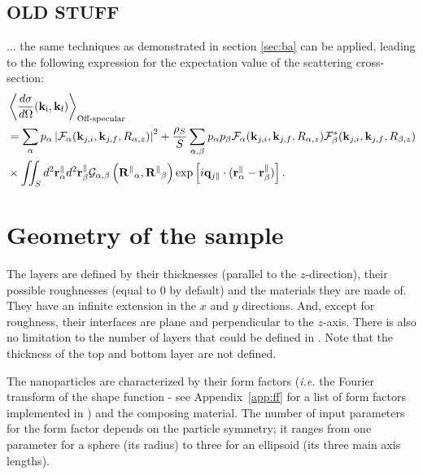 \subsection{OLD STUFF}

... the same techniques as demonstrated in section \ref{sec:ba} can be applied, leading to the following expression for the expectation value of the scattering cross-section:
\begin{align*}
  & \left\langle \frac{d\sigma}{d\Omega}(\mathbf{k}_{\text{i}},\mathbf{k}_{\text{f}}) \right\rangle_{\text{Off-specular}}  \\
  & = \sum_\alpha p_\alpha \left\lvert \mathcal{F}_\alpha(\mathbf{k}_{j,i},\mathbf{k}_{j,f}, R_{\alpha,z})\right\rvert ^2 + \frac{\rho_S}{S}\sum_{\alpha,\beta} p_\alpha p_\beta \mathcal{F}_\alpha (\mathbf{k}_{j,i},\mathbf{k}_{j,f}, R_{\alpha,z})\mathcal{F}_\beta^*(\mathbf{k}_{j,i},\mathbf{k}_{j,f}, R_{\beta,z}) \\
  & \times \iint_S d^2\mathbf{r}_\alpha^\parallel d^2\mathbf{r}_\beta^\parallel \mathcal{G}_{\alpha ,\beta}\left( \mathbf{R^\parallel}_{\alpha} , \mathbf{R^\parallel}_{\beta} \right) \exp \left[ i\mathbf{q}_{j\parallel}\cdot (\mathbf{r}_\alpha^\parallel - \mathbf{r}_\beta^\parallel ) \right].
\end{align*}

\section{Geometry of the sample}

The layers are defined by their thicknesses (parallel to the
$z$-direction), their possible
roughnesses (equal to 0 by default) and the
materials they are made of. They have an infinite extension in the $x$ and $y$
directions. And, except for roughness, their interfaces are plane and
perpendicular to the $z$-axis. There is also no limitation to the
number of layers that could be defined in \BornAgain. Note that the
thickness of the top and bottom layer are not defined.


The nanoparticles are characterized by their form factors
(\textit{i.e.} the Fourier transform of the shape function - see Appendix~\ref{app:ff} for a list of form factors implemented in \BornAgain) and the composing material. The number of input parameters for the form factor depends on the particle symmetry; it ranges from one parameter for a sphere (its radius) to three for an ellipsoid (its three main axis lengths).
  
